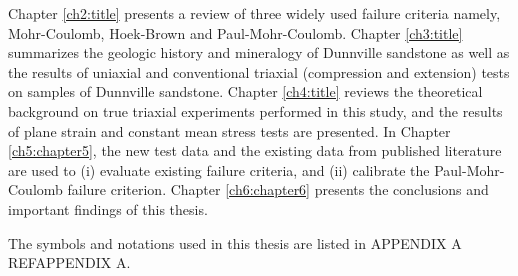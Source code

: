 Chapter \ref{ch2:title} presents a review of three widely used failure criteria namely, Mohr-Coulomb, Hoek-Brown and Paul-Mohr-Coulomb. Chapter \ref{ch3:title} summarizes the geologic history and mineralogy of Dunnville sandstone as well as the results of uniaxial and conventional triaxial (compression and extension) tests on samples of Dunnville sandstone. Chapter \ref{ch4:title} reviews the theoretical background on true triaxial experiments performed in this study, and the results of plane strain and constant mean stress tests are presented. In Chapter \ref{ch5:chapter5}, the new test data and the existing data from published literature are used to (i) evaluate existing failure criteria, and (ii) calibrate the Paul-Mohr-Coulomb failure criterion. Chapter \ref{ch6:chapter6} presents the conclusions and important findings of this thesis. 

The symbols and notations used in this thesis are listed in APPENDIX A REF{APPENDIX A}.